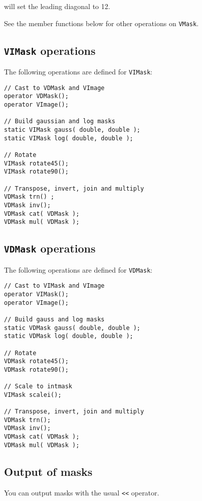 \noindent
will set the leading diagonal to 12.

See the member functions below for other operations on \verb+VMask+.

\subsection{\texttt{VIMask} operations}

The following operations are defined for \verb+VIMask+:

\begin{verbatim}
// Cast to VDMask and VImage
operator VDMask();
operator VImage();

// Build gaussian and log masks
static VIMask gauss( double, double );
static VIMask log( double, double );

// Rotate
VIMask rotate45();
VIMask rotate90();

// Transpose, invert, join and multiply
VDMask trn() ;
VDMask inv();
VDMask cat( VDMask );
VDMask mul( VDMask );
\end{verbatim}

\subsection{\texttt{VDMask} operations}

The following operations are defined for \verb+VDMask+:

\begin{verbatim}
// Cast to VIMask and VImage
operator VIMask();
operator VImage();

// Build gauss and log masks
static VDMask gauss( double, double );
static VDMask log( double, double );

// Rotate
VDMask rotate45();
VDMask rotate90(); 

// Scale to intmask
VIMask scalei();

// Transpose, invert, join and multiply
VDMask trn();
VDMask inv();
VDMask cat( VDMask );
VDMask mul( VDMask );
\end{verbatim}

\subsection{Output of masks}

You can output masks with the usual \verb+<<+ operator.
